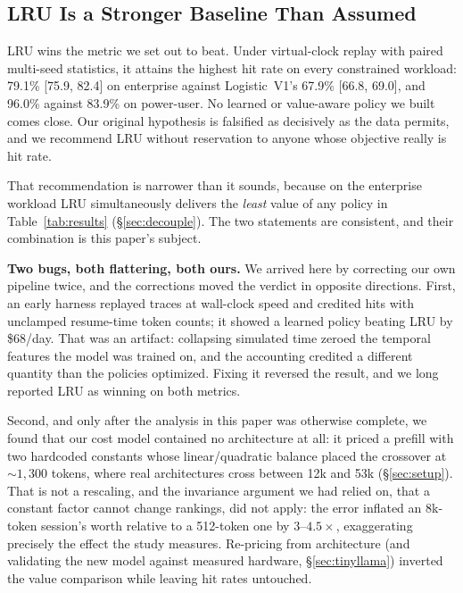 \documentclass[letterpaper,twocolumn,10pt]{article}
\begin{document}
\subsection{LRU Is a Stronger Baseline Than Assumed}
\label{sec:lru_strong}

LRU wins the metric we set out to beat. Under virtual-clock replay with paired multi-seed statistics, it attains the highest hit rate on every constrained workload: 79.1\% [75.9, 82.4] on enterprise against Logistic~V1's 67.9\% [66.8, 69.0], and 96.0\% against 83.9\% on power-user. No learned or value-aware policy we built comes close. Our original hypothesis is falsified as decisively as the data permits, and we recommend LRU without reservation to anyone whose objective really is hit rate.

That recommendation is narrower than it sounds, because on the enterprise workload LRU simultaneously delivers the \emph{least} value of any policy in Table~\ref{tab:results} (\S\ref{sec:decouple}). The two statements are consistent, and their combination is this paper's subject.

\textbf{Two bugs, both flattering, both ours.} We arrived here by correcting our own pipeline twice, and the corrections moved the verdict in opposite directions. First, an early harness replayed traces at wall-clock speed and credited hits with unclamped resume-time token counts; it showed a learned policy beating LRU by \$68/day. That was an artifact: collapsing simulated time zeroed the temporal features the model was trained on, and the accounting credited a different quantity than the policies optimized. Fixing it reversed the result, and we long reported LRU as winning on both metrics.

Second, and only after the analysis in this paper was otherwise complete, we found that our cost model contained no architecture at all: it priced a prefill with two hardcoded constants whose linear/quadratic balance placed the crossover at ${\sim}1{,}300$ tokens, where real architectures cross between 12k and 53k (\S\ref{sec:setup}). That is not a rescaling, and the invariance argument we had relied on, that a constant factor cannot change rankings, did not apply: the error inflated an 8k-token session's worth relative to a 512-token one by $3\text{--}4.5\times$, exaggerating precisely the effect the study measures. Re-pricing from architecture (and validating the new model against measured hardware, \S\ref{sec:tinyllama}) inverted the value comparison while leaving hit rates untouched.
\end{document}

